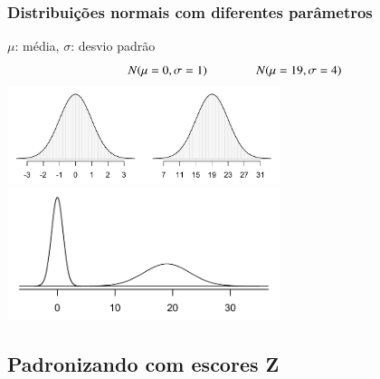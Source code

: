 \begin{frame}
\frametitle{Distribuições normais com diferentes parâmetros}

\vspace{-0.5cm}
\begin{center}
$\mu$: média, $\sigma$: desvio padrão
\[N(\mu = 0, \sigma = 1) \hspace{1.4cm} N(\mu = 19, \sigma = 4) \]
\includegraphics[width=0.6\textwidth]{3-1_normal_distribution/twoSampleNormals.pdf} \\
\includegraphics[width=0.6\textwidth]{3-1_normal_distribution/twoSampleNormalsStacked.pdf}
\end{center}

\end{frame}


\subsection{Padronizando com escores Z}


